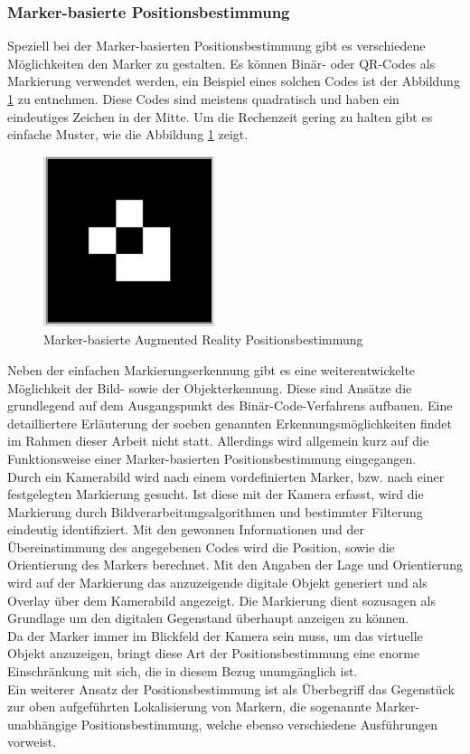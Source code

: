 \subsubsection*{Marker-basierte Positionsbestimmung}
Speziell bei der Marker-basierten Positionsbestimmung gibt es verschiedene Möglichkeiten den Marker zu gestalten. Es können 
Binär- oder QR-Codes als Markierung verwendet werden, ein Beispiel eines solchen Codes ist der Abbildung \ref{pic:markerARpos} zu entnehmen. 
Diese Codes sind meistens quadratisch und haben ein eindeutiges Zeichen in der Mitte. Um die Rechenzeit gering zu halten gibt es einfache Muster, 
wie die Abbildung \ref{pic:markerARpos} zeigt.
\begin{figure}[hbt!]
    \centering
    \includegraphics[width=5cm,height=5cm,keepaspectratio]{2Grundlagen/Bilder/bildmarkerAR.png}
    \caption{Marker-basierte Augmented Reality Positionsbestimmung}
    \label{pic:markerARpos}
\end{figure}
Neben der einfachen Markierungserkennung gibt es eine weiterentwickelte Möglichkeit der Bild- sowie der Objekterkennung. Diese sind Ansätze 
die grundlegend auf dem Ausgangspunkt des Binär-Code-Verfahrens aufbauen. Eine detailliertere Erläuterung der soeben genannten 
Erkennungsmöglichkeiten findet im Rahmen dieser Arbeit nicht statt. Allerdings wird allgemein kurz auf die Funktionsweise einer 
Marker-basierten Positionsbestimmung eingegangen.
\\ 
Durch ein Kamerabild wird nach einem vordefinierten Marker, bzw. nach einer festgelegten Markierung gesucht. Ist diese mit der Kamera erfasst, 
wird die Markierung durch Bildverarbeitungsalgorithmen und bestimmter Filterung eindeutig identifiziert. Mit den gewonnen Informationen und 
der Übereinstimmung des angegebenen Codes wird die Position, sowie die Orientierung des Markers berechnet. Mit den Angaben der Lage und 
Orientierung wird auf der Markierung das anzuzeigende digitale Objekt generiert und als Overlay über dem Kamerabild angezeigt. Die Markierung 
dient sozusagen als Grundlage um den digitalen Gegenstand überhaupt anzeigen zu können.
\\ 
Da der Marker immer im Blickfeld der Kamera sein muss, um das virtuelle Objekt anzuzeigen, bringt diese Art der Positionsbestimmung eine 
enorme Einschränkung mit sich, die in diesem Bezug unumgänglich ist. 
\\ 
\linebreak
Ein weiterer Ansatz der Positionsbestimmung ist als Überbegriff das Gegenstück zur oben aufgeführten Lokalisierung von Markern, die 
sogenannte Marker-unabhängige Positionsbestimmung, welche ebenso verschiedene Ausführungen vorweist. 
